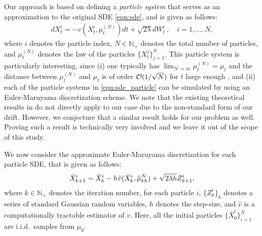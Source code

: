 Our approach is based on defining a \emph{particle system} that serves as an approximation to the original SDE \eqref{eqn:sde}, and is given as follows:
\begin{align}
d X_t^i = - v(X_t^i, \mu_t^{(N)}) dt + \sqrt{2 \lambda } d W_t^i \> , \quad i = 1,\dots, N, \label{eqn:sde_particle}
\end{align}
where $i$ denotes the particle index, $N \in \mathbb{N}_+$ denotes the total number of particles, and $\mu_t^{(N)}$ denotes the law of the particles $\{X_t^j\}_{j=1}^N$. This particle system is particularly interesting, since (i) one typically has $\lim_{N \rightarrow \infty} \mu_t^{(N)}= \mu_t $ and the distance between $\mu_t^{(N)}$ and $\mu_t$ is of order ${\cal O}(1/\sqrt{N})$ for $t$ large enough \cite{malrieu03,cgm-08}, and (ii) each of the particle systems in \eqref{eqn:sde_particle} can be simulated by using an Euler-Maruyama discretization scheme. We note that the existing theoretical results in \cite{veretennikov2006ergodic,mishura2016existence} do not directly apply to our case due to the non-standard form of our drift. However, we conjecture that a similar result holds for our problem as well. Proving such a result is technically very involved and we leave it out of the scope of this study. %

We now consider the approximate Euler-Maruyama discretization for each particle SDE, that is given as follows:
\begin{align}
\bar{X}^i_{k+1} = \bar{X}^i_k - h \hspace{0.5pt} \hat{v}(\bar{X}^i_k, \hat{\mu}_{kh}^N ) + \sqrt{2 \lambda h} Z^i_{k+1},
\end{align}
where $k \in \mathbb{N}_+$ denotes the iteration number, for each particle $i$, $\{Z^i_k\}_{k}$ denotes a series of standard Gaussian random variables, $h$ denotes the step-size, and $\hat{v}$ is a computationally tractable estimator of $v$. Here, all the initial particles $\{\bar{X}_0^i\}_{i=1}^N$ are i.i.d.\ samples from $\mu_0$.

